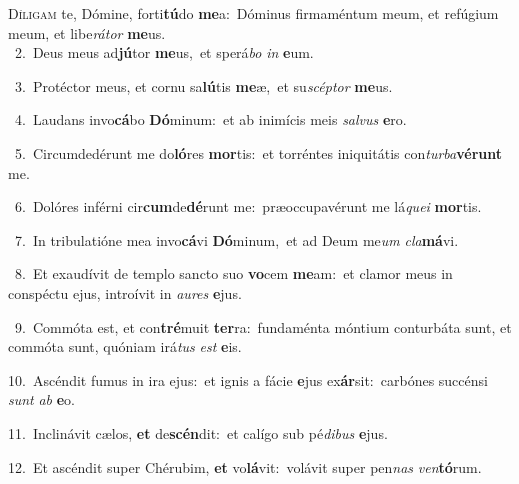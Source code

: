 \lettrine{\initial\textcolor{\initialcolor}{D}}{íligam} te, Dómine, forti\-\textbf{tú}\-do \textbf{me}\-a:~\star Dóminus firmaméntum meum, et refúgium meum, et libe\-\textit{rá}\-\textit{tor} \textbf{me}\-us.\\
{\numbfont\textcolor{\numbcolor}{~2.}}~Deus meus ad\-\textbf{jú}\-tor \textbf{me}\-us,~\star et sperá\textit{bo} \textit{in} \textbf{e}\-um.\par
{\numbfont\textcolor{\numbcolor}{~3.}}~Protéctor meus, et cornu sa\-\textbf{lú}\-tis \textbf{me}\-æ,~\star et su\-\textit{scép}\-\textit{tor} \textbf{me}\-us.\par
{\numbfont\textcolor{\numbcolor}{~4.}}~Laudans invo\-\textbf{cá}\-bo \textbf{Dó}\-minum:~\star et ab inimícis meis \textit{sal}\-\textit{vus} \textbf{e}\-ro.\par
{\numbfont\textcolor{\numbcolor}{~5.}}~Circumdedérunt me do\-\textbf{ló}\-res \textbf{mor}\-tis:~\star et torréntes iniquitátis con\-\textit{tur}\-\textit{ba}\textbf{vé}\textbf{runt} me.\par
{\numbfont\textcolor{\numbcolor}{~6.}}~Dolóres inférni cir\-\textbf{cum}\-de\-\textbf{dé}\-runt me:~\star præoccupavérunt me lá\-\textit{que}\-\textit{i} \textbf{mor}\-tis.\par
{\numbfont\textcolor{\numbcolor}{~7.}}~In tribulatióne mea invo\-\textbf{cá}\-vi \textbf{Dó}\-minum,~\star et ad Deum me\textit{um} \textit{cla}\-\textbf{má}vi.\par
{\numbfont\textcolor{\numbcolor}{~8.}}~Et exaudívit de templo sancto suo \textbf{vo}\-cem \textbf{me}\-am:~\star et clamor meus in conspéctu ejus, introívit in \textit{au}\-\textit{res} \textbf{e}\-jus.\par
{\numbfont\textcolor{\numbcolor}{~9.}}~Commóta est, et con\-\textbf{tré}\-muit \textbf{ter}\-ra:~\star fundaménta móntium conturbáta sunt, et commóta sunt, quóniam irá\textit{tus} \textit{est} \textbf{e}\-is.\par
{\numbfont\textcolor{\numbcolor}{10.}}~Ascéndit fumus in ira ejus:~\dagger et ignis a fácie \textbf{e}\-jus ex\-\textbf{ár}\-sit:~\star carbónes succénsi \textit{sunt} \textit{ab} \textbf{e}\-o.\par
{\numbfont\textcolor{\numbcolor}{11.}}~Inclinávit cælos, \textbf{et} de\-\textbf{scén}\-dit:~\star et calígo sub pé\-\textit{di}\-\textit{bus} \textbf{e}\-jus.\par
{\numbfont\textcolor{\numbcolor}{12.}}~Et ascéndit super Chérubim, \textbf{et} vo\-\textbf{lá}\-vit:~\star volávit super pen\textit{nas} \textit{ven}\-\textbf{tó}rum.\par
